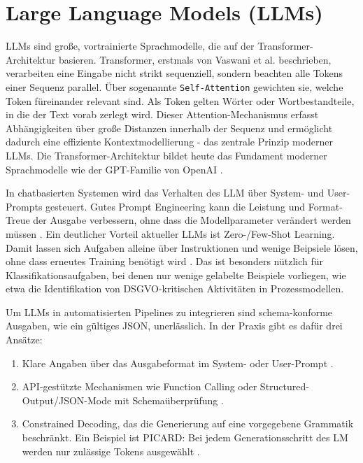 \section{Large Language Models (LLMs)}\label{sec:llms}

\acp{LLM} sind große, vortrainierte Sprachmodelle, die auf der Transformer-Architektur basieren. Transformer, erstmals von Vaswani et al. \cite{vaswani2017attention} beschrieben, verarbeiten eine Eingabe nicht strikt sequenziell, sondern beachten alle Tokens einer Sequenz parallel. Über sogenannte \texttt{Self-Attention} gewichten sie, welche Token füreinander relevant sind. Als Token gelten Wörter oder Wortbestandteile, in die der Text vorab zerlegt wird. Dieser Attention-Mechanismus erfasst Abhängigkeiten über große Distanzen innerhalb der Sequenz und ermöglicht dadurch eine effiziente Kontextmodellierung - das zentrale Prinzip moderner \acp{LLM}. Die Transformer-Architektur bildet heute das Fundament moderner Sprachmodelle wie der GPT-Familie von OpenAI \cite{ibm-gpt, minaee2025largelanguagemodelssurvey, openai-models}.

In chatbasierten Systemen wird das Verhalten des \ac{LLM} über System- und User-Prompts gesteuert. Gutes Prompt Engineering kann die Leistung und Format-Treue der Ausgabe verbessern, ohne dass die Modellparameter verändert werden müssen \cite{liu2023prompting}. Ein deutlicher Vorteil aktueller \acp{LLM} ist Zero-/Few-Shot Learning. Damit lassen sich Aufgaben alleine über Instruktionen und wenige Beipsiele lösen, ohne dass erneutes Training benötigt wird \cite{brown2020fewshot, liu2023prompting}. Das ist besonders nützlich für Klassifikationsaufgaben, bei denen nur wenige gelabelte Beispiele vorliegen, wie etwa die Identifikation von \ac{DSGVO}-kritischen Aktivitäten in Prozessmodellen.

Um \acp{LLM} in automatisierten Pipelines zu integrieren sind schema-konforme Ausgaben, wie ein gültiges JSON, unerlässlich. In der Praxis gibt es dafür drei Ansätze:

\begin{enumerate}
    \item Klare Angaben über das Ausgabeformat im System- oder User-Prompt \cite{liu2023prompting}.
    \item API-gestützte Mechanismen wie Function Calling oder Structured-Output/JSON-Mode mit Schemaüberprüfung \cite{mistralai_structured_output, openai_function_calling_2023, openai_structured_output}.
    \item Constrained Decoding, das die Generierung auf eine vorgegebene Grammatik beschränkt. Ein Beispiel ist PICARD: Bei jedem Generationsschritt des \ac{LM} werden nur zulässige Tokens ausgewählt \cite{scholak2021picard}.
\end{enumerate}

